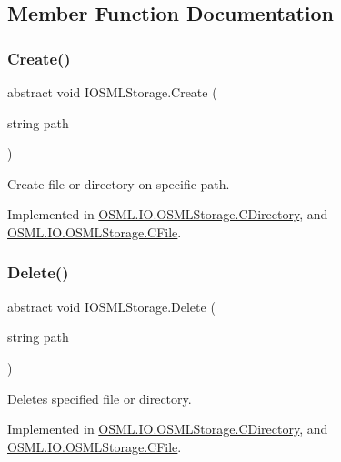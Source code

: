 \subsection{Member Function Documentation}
\mbox{\label{classIOSMLStorage_a95cdf051ac2045a9cfa4fb29a78b26c0}} 
\subsubsection{\texorpdfstring{Create()}{Create()}}
{\footnotesize\ttfamily abstract void I\+O\+S\+M\+L\+Storage.\+Create (\begin{DoxyParamCaption}\item[{string}]{path }\end{DoxyParamCaption})\hspace{0.3cm}{\ttfamily [pure virtual]}}



Create file or directory on specific path. 



Implemented in \mbox{\hyperlink{classOSML_1_1IO_1_1OSMLStorage_1_1CDirectory_a25890d178542da52c0b87200cfe3cb87}{O\+S\+M\+L.\+I\+O.\+O\+S\+M\+L\+Storage.\+C\+Directory}}, and \mbox{\hyperlink{classOSML_1_1IO_1_1OSMLStorage_1_1CFile_a1854c3a8403c27dda2bce815c0000697}{O\+S\+M\+L.\+I\+O.\+O\+S\+M\+L\+Storage.\+C\+File}}.

\mbox{\label{classIOSMLStorage_aca08055c799d8c86bfdc427c54b92993}} 
\subsubsection{\texorpdfstring{Delete()}{Delete()}}
{\footnotesize\ttfamily abstract void I\+O\+S\+M\+L\+Storage.\+Delete (\begin{DoxyParamCaption}\item[{string}]{path }\end{DoxyParamCaption})\hspace{0.3cm}{\ttfamily [pure virtual]}}



Deletes specified file or directory. 



Implemented in \mbox{\hyperlink{classOSML_1_1IO_1_1OSMLStorage_1_1CDirectory_a6568c6fcd267277ec3e032802fe50d1c}{O\+S\+M\+L.\+I\+O.\+O\+S\+M\+L\+Storage.\+C\+Directory}}, and \mbox{\hyperlink{classOSML_1_1IO_1_1OSMLStorage_1_1CFile_a23dcf0c1471b9eb59e43b46ce7e6fa48}{O\+S\+M\+L.\+I\+O.\+O\+S\+M\+L\+Storage.\+C\+File}}.

